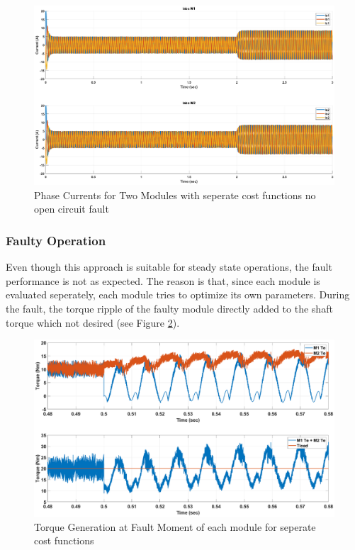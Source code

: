 \documentclass{article}
\begin{document}
\begin{figure}[H]
\centering
\includegraphics[scale=0.3]{Figures/TwoModule/SeperateCost/Ia_Ib_Ic.eps}
\caption{Phase Currents for Two Modules with seperate cost functions no open circuit fault}
\label{fig:Current_abc_TwoModuleSeperateCost}
\end{figure}
\subsubsection{Faulty Operation}
Even though this approach is suitable for steady state operations, the fault performance is not as expected. The reason is that, since each module is evaluated seperately, each module tries to optimize its own parameters. During the fault, the torque ripple of the faulty module directly added to the shaft torque which not desired (see Figure \ref{fig:FaultMomentSeperateCost}).

\begin{figure}[H]
\centering
\includegraphics[scale=0.3]{Figures/TwoModule/SeperateCost/FaultMoment.eps}
\caption{Torque Generation at Fault Moment of each module for seperate cost functions}
\label{fig:FaultMomentSeperateCost}
\end{figure}
\end{document}
